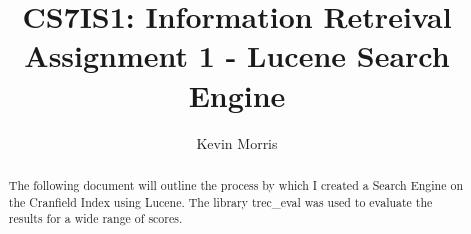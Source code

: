 \documentclass[acmtog, authorversion]{acmart}
\begin{document}
\title{CS7IS1: Information Retreival Assignment 1 - Lucene Search Engine}

\author{Kevin Morris}


\begin{abstract}
The following document will outline the process by which I created a Search Engine on the Cranfield Index using Lucene. The library trec\_eval was used to evaluate the results for a wide range of scores. 
\end{abstract}

\maketitle


\end{document}
